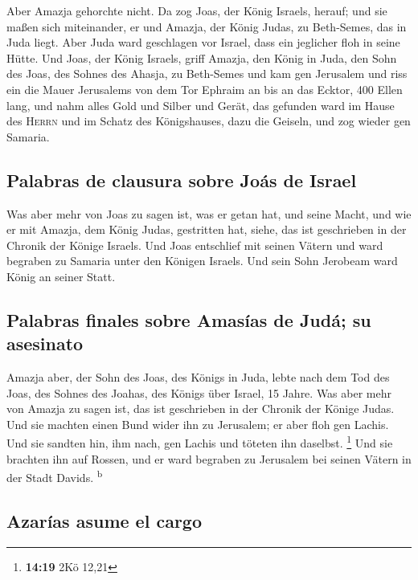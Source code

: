  Aber Amazja gehorchte nicht. Da zog Joas, der König
Israels, herauf; und sie maßen sich miteinander, er und Amazja, der
König Judas, zu Beth-Semes, das in Juda liegt.  Aber Juda
ward geschlagen vor Israel, dass ein jeglicher floh in seine Hütte.
 Und Joas, der König Israels, griff Amazja, den König in
Juda, den Sohn des Joas, des Sohnes des Ahasja, zu Beth-Semes und kam
gen Jerusalem und riss ein die Mauer Jerusalems von dem Tor Ephraim an
bis an das Ecktor, 400 Ellen lang,  und nahm alles Gold
und Silber und Gerät, das gefunden ward im Hause des \textsc{Herrn} und
im Schatz des Königshauses, dazu die Geiseln, und zog wieder gen
Samaria.

\hypertarget{palabras-de-clausura-sobre-jouxe1s-de-israel}{%
\subsection{Palabras de clausura sobre Joás de
Israel}\label{palabras-de-clausura-sobre-jouxe1s-de-israel}}

 Was aber mehr von Joas zu sagen ist, was er getan hat,
und seine Macht, und wie er mit Amazja, dem König Judas, gestritten hat,
siehe, das ist geschrieben in der Chronik der Könige Israels.
 Und Joas entschlief mit seinen Vätern und ward begraben
zu Samaria unter den Königen Israels. Und sein Sohn Jerobeam ward König
an seiner Statt.

\hypertarget{palabras-finales-sobre-amasuxedas-de-juduxe1-su-asesinato}{%
\subsection{Palabras finales sobre Amasías de Judá; su
asesinato}\label{palabras-finales-sobre-amasuxedas-de-juduxe1-su-asesinato}}

 Amazja aber, der Sohn des Joas, des Königs in Juda,
lebte nach dem Tod des Joas, des Sohnes des Joahas, des Königs über
Israel, 15 Jahre.  Was aber mehr von Amazja zu sagen ist,
das ist geschrieben in der Chronik der Könige Judas.  Und
sie machten einen Bund wider ihn zu Jerusalem; er aber floh gen Lachis.
Und sie sandten hin, ihm nach, gen Lachis und töteten ihn daselbst.
\footnote{\textbf{14:19} 2Kö 12,21}  Und sie brachten ihn
auf Rossen, und er ward begraben zu Jerusalem bei seinen Vätern in der
Stadt Davids. \textsuperscript{b}

\hypertarget{azaruxedas-asume-el-cargo}{%
\subsection{Azarías asume el cargo}\label{azaruxedas-asume-el-cargo}}

